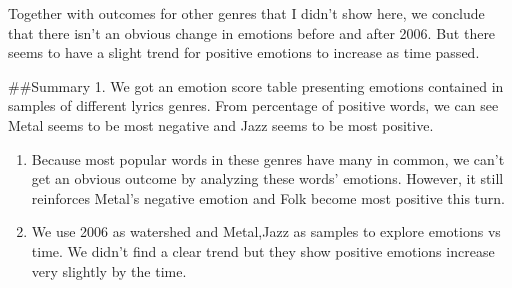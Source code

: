 \documentclass[]{article}
\begin{document}
Together with outcomes for other genres that I didn't show here, we
conclude that there isn't an obvious change in emotions before and after
2006. But there seems to have a slight trend for positive emotions to
increase as time passed.

\#\#Summary 1. We got an emotion score table presenting emotions
contained in samples of different lyrics genres. From percentage of
positive words, we can see Metal seems to be most negative and Jazz
seems to be most positive.

\begin{enumerate}
\def\labelenumi{\arabic{enumi}.}
\setcounter{enumi}{1}
\item
  Because most popular words in these genres have many in common, we
  can't get an obvious outcome by analyzing these words' emotions.
  However, it still reinforces Metal's negative emotion and Folk become
  most positive this turn.
\item
  We use 2006 as watershed and Metal,Jazz as samples to explore emotions
  vs time. We didn't find a clear trend but they show positive emotions
  increase very slightly by the time.
\end{enumerate}
\end{document}
